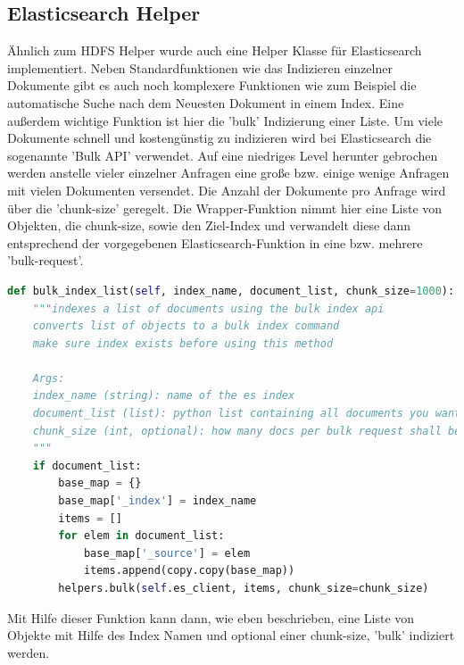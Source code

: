 \documentclass[12pt,oneside,a4paper,parskip]{scrbook}
\begin{document}
\subsection{Elasticsearch Helper}
\"Ahnlich zum HDFS Helper wurde auch eine Helper Klasse f\"ur Elasticsearch implementiert. Neben Standardfunktionen wie das Indizieren einzelner Dokumente gibt es auch noch komplexere Funktionen wie zum Beispiel die automatische Suche nach dem Neuesten Dokument in einem Index. Eine außerdem wichtige Funktion ist hier die 'bulk' Indizierung einer Liste. Um viele Dokumente schnell und kosteng\"unstig zu indizieren wird bei Elasticsearch die sogenannte 'Bulk API' verwendet. Auf eine niedriges Level herunter gebrochen werden anstelle vieler einzelner Anfragen eine große bzw. einige wenige Anfragen mit vielen Dokumenten versendet. Die Anzahl der Dokumente pro Anfrage wird \"uber die 'chunk-size' geregelt. Die Wrapper-Funktion nimmt hier eine Liste von Objekten, die chunk-size, sowie den Ziel-Index und verwandelt diese dann entsprechend der vorgegebenen Elasticsearch-Funktion in eine bzw. mehrere 'bulk-request'.
\begin{lstlisting}[basicstyle=\small, caption=Elasticsearch Helper f\"ur Bulk Indizierung ,label=esBulk,language=python]
	def bulk_index_list(self, index_name, document_list, chunk_size=1000):
	"""indexes a list of documents using the bulk index api
	converts list of objects to a bulk index command
	make sure index exists before using this method

	Args:
	index_name (string): name of the es index
	document_list (list): python list containing all documents you want to index
	chunk_size (int, optional): how many docs per bulk request shall be added to the request. Defaults to 10000.
	"""
	if document_list:
		base_map = {}
		base_map['_index'] = index_name
		items = []
		for elem in document_list:
			base_map['_source'] = elem
			items.append(copy.copy(base_map))
		helpers.bulk(self.es_client, items, chunk_size=chunk_size)
\end{lstlisting}
Mit Hilfe dieser Funktion kann dann, wie eben beschrieben, eine Liste von Objekte mit Hilfe des Index Namen und optional einer chunk-size, 'bulk' indiziert werden.
\pagebreak
\end{document}
